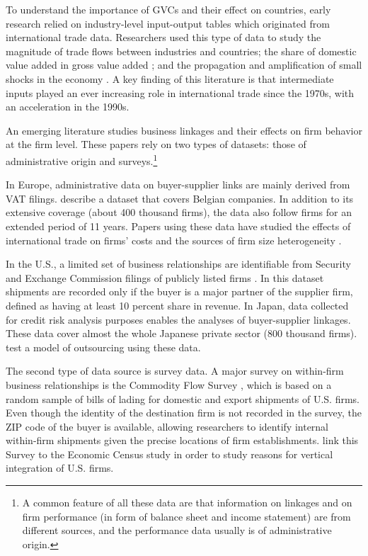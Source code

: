 \documentclass[final, dvipsnames, authoryear,12pt]{elsarticle}
\begin{document}
To understand the importance of GVCs and their effect on countries, early research relied on industry-level input-output tables which originated  from international trade data. Researchers used this type of data to study the magnitude of trade flows between industries and countries; the share of domestic value added in gross value added \citep{johnson2012accounting, hummels2001nature}; and the propagation and amplification of small shocks in the economy \citep{acemoglu2016networks}. A key finding of this literature is that intermediate inputs played an ever increasing role in international trade since the 1970s, with an acceleration in the 1990s. 


An emerging literature studies business linkages and their effects on firm behavior at the firm level. These papers rely on two types of datasets: those of administrative origin and surveys.\footnote{A common feature of all these data are that information on linkages and on firm performance (in form of balance sheet and income statement) are from different sources, and the performance data usually is of administrative origin.} 

In Europe, administrative data on buyer-supplier links are mainly derived from VAT filings. \cite{dhyne2015belgian} describe a dataset that covers Belgian companies. In addition to its extensive coverage (about 400 thousand firms), the data also follow firms for an extended period of 11 years. Papers using these data have studied the effects of international trade on firms' costs \citep{tintelnot2018trade} and the sources of firm size heterogeneity \citep{bernard2019production}. 

In the U.S., a limited set of business relationships are identifiable from Security and Exchange Commission filings of publicly listed firms \citep{Barrot2016-wc}. In this dataset shipments are recorded only if the buyer is a major partner of the supplier firm, defined as having at least 10 percent share in revenue. In Japan, data collected for credit risk analysis purposes enables the analyses of buyer-supplier linkages. These data cover almost the whole Japanese private sector (800 thousand firms). \cite{bernard2019production} test a model of outsourcing using these data. 

The second type of data source is survey data. A major survey on within-firm business relationships is the Commodity Flow Survey \cite{CFS}, which is based on a random sample of bills of lading for domestic and export shipments of U.S. firms. Even though the identity of the destination firm is not recorded in the survey, the ZIP code of the buyer is available, allowing researchers to identify internal within-firm shipments given the precise locations of firm establishments. \cite{atalay2014vertical} link this Survey to the Economic Census study in order to study reasons for vertical integration of U.S. firms.  
\end{document}
